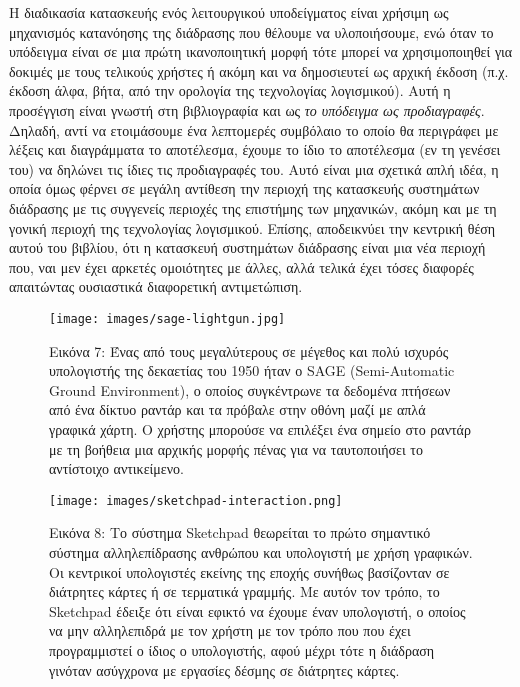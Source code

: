 \documentclass[
]{article}
\begin{document}
Η διαδικασία κατασκευής ενός λειτουργικού υποδείγματος είναι χρήσιμη ως
μηχανισμός κατανόησης της διάδρασης που θέλουμε να υλοποιήσουμε, ενώ
όταν το υπόδειγμα είναι σε μια πρώτη ικανοποιητική μορφή τότε μπορεί να
χρησιμοποιηθεί για δοκιμές με τους τελικούς χρήστες ή ακόμη και να
δημοσιευτεί ως αρχική έκδοση (π.χ. έκδοση άλφα, βήτα, από την ορολογία
της τεχνολογίας λογισμικού). Αυτή η προσέγγιση είναι γνωστή στη
βιβλιογραφία και ως \emph{το υπόδειγμα ως προδιαγραφές}. Δηλαδή, αντί να
ετοιμάσουμε ένα λεπτομερές συμβόλαιο το οποίο θα περιγράφει με λέξεις
και διαγράμματα το αποτέλεσμα, έχουμε το ίδιο το αποτέλεσμα (εν τη
γενέσει του) να δηλώνει τις ίδιες τις προδιαγραφές του. Αυτό είναι μια
σχετικά απλή ιδέα, η οποία όμως φέρνει σε μεγάλη αντίθεση την περιοχή
της κατασκευής συστημάτων διάδρασης με τις συγγενείς περιοχές της
επιστήμης των μηχανικών, ακόμη και με τη γονική περιοχή της τεχνολογίας
λογισμικού. Επίσης, αποδεικνύει την κεντρική θέση αυτού του βιβλίου, ότι
η κατασκευή συστημάτων διάδρασης είναι μια νέα περιοχή που, ναι μεν έχει
αρκετές ομοιότητες με άλλες, αλλά τελικά έχει τόσες διαφορές απαιτώντας
ουσιαστικά διαφορετική αντιμετώπιση.

\leavevmode{}%
\begin{figure}
\hypertarget{fig:sage-lightgun}{%
\centering
\texttt{[image: images/sage-lightgun.jpg]}
\caption{Εικόνα 7: Ένας από τους μεγαλύτερους σε μέγεθος και πολύ
ισχυρός υπολογιστής της δεκαετίας του 1950 ήταν ο SAGE (Semi-Automatic
Ground Environment), ο οποίος συγκέντρωνε τα δεδομένα πτήσεων από ένα
δίκτυο ραντάρ και τα πρόβαλε στην οθόνη μαζί με απλά γραφικά χάρτη. Ο
χρήστης μπορούσε να επιλέξει ένα σημείο στο ραντάρ με τη βοήθεια μια
αρχικής μορφής πένας για να ταυτοποιήσει το αντίστοιχο
αντικείμενο.}\label{fig:sage-lightgun}
}
\end{figure}

\leavevmode{}%
\begin{figure}
\hypertarget{fig:sketchpad-interaction}{%
\centering
\texttt{[image: images/sketchpad-interaction.png]}
\caption{Εικόνα 8: Το σύστημα Sketchpad θεωρείται το πρώτο σημαντικό
σύστημα αλληλεπίδρασης ανθρώπου και υπολογιστή με χρήση γραφικών. Οι
κεντρικοί υπολογιστές εκείνης της εποχής συνήθως βασίζονταν σε διάτρητες
κάρτες ή σε τερματικά γραμμής. Με αυτόν τον τρόπο, το Sketchpad έδειξε
ότι είναι εφικτό να έχουμε έναν υπολογιστή, ο οποίος να μην αλληλεπιδρά
με τον χρήστη με τον τρόπο που που έχει προγραμμιστεί ο ίδιος ο
υπολογιστής, αφού μέχρι τότε η διάδραση γινόταν ασύγχρονα με εργασίες
δέσμης σε διάτρητες κάρτες.}\label{fig:sketchpad-interaction}
}
\end{figure}
\end{document}
